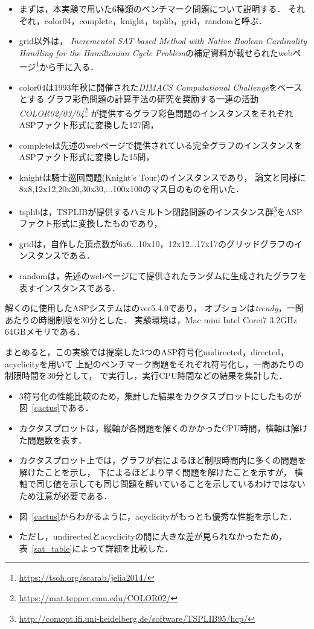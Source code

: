 \begin{itemize}
\item まずは，本実験で用いた6種類のベンチマーク問題について説明する．
それぞれ，color04，complete，knight，tsplib，grid，randomと呼ぶ．
\item grid以外は，
\textit{Incremental SAT-based Method with Native Boolean Cardinality Handling for the Hamiltonian Cycle Problem}\cite{soh14:jelia2014}の補足資料が載せられたwebページ\footnote{\url{https://tsoh.org/scarab/jelia2014/}}から手に入る．
\item color04は1993年秋に開催された\textit{DIMACS Computational Challenge}をベースとする
グラフ彩色問題の計算手法の研究を奨励する一連の活動
\textit{COLOR02/03/04}\footnote{\url{https://mat.tepper.cmu.edu/COLOR02/}}
が提供するグラフ彩色問題のインスタンスをそれぞれASPファクト形式に変換した127問，
\item completeは先述のwebページ\footnotemark[1]で提供されている完全グラフのインスタンスをASPファクト形式に変換した15問，
\item knightは騎士巡回問題(Knight's Tour)のインスタンスであり，
論文\cite{soh14:jelia2014}と同様に8x8,12x12,20x20,30x30,...100x100のマス目のものを用いた．
\item tsplibは，TSPLIBが提供するハミルトン閉路問題のインスタンス群\footnote{\url{http://comopt.ifi.uni-heidelberg.de/software/TSPLIB95/hcp/}}をASPファクト形式に変換したものであり，
\item gridは，自作した頂点数が6x6...10x10，12x12...17x17のグリッドグラフのインスタンスである．
\item randomは，先述のwebページ\footnotemark[1]にて提供されたランダムに生成されたグラフを表すインスタンスである．
\end{itemize}

解くのに使用したASPシステムは{\clingo}のver5.4.0であり，
オプションは\textit{trendy}，一問あたりの時間制限を30分とした．
実験環境は，Mac mini Intel Corei7 3.2GHz 64GBメモリである．

まとめると，この実験では提案した3つのASP符号化\textsf{undirected}，\textsf{directed}，\textsf{acyclicity}を用いて
上記のベンチマーク問題をそれぞれ符号化し，一問あたりの制限時間を30分として，
{\clingo}で実行し，実行CPU時間などの結果を集計した．

\begin{itemize}
\item 3符号化の性能比較のため，集計した結果をカクタスプロットにしたものが図~\ref{cactus}である．
\item カクタスプロットは，縦軸が各問題を解くのかかったCPU時間，横軸は解けた問題数を表す．
\item カクタスプロット上では，グラフが右によるほど制限時間内に多くの問題を解けたことを示し，
  下によるほどより早く問題を解けたことを示すが，
  横軸で同じ値を示しても同じ問題を解いていることを示しているわけではないため注意が必要である．
\item 図~\ref{cactus}からわかるように，\textsf{acyclicity}がもっとも優秀な性能を示した．
\item ただし，\textsf{undirected}と\textsf{acyclicity}の間に大きな差が見られなかったため，
  表~\ref{sat_table}によって詳細を比較した．
\end{itemize}

